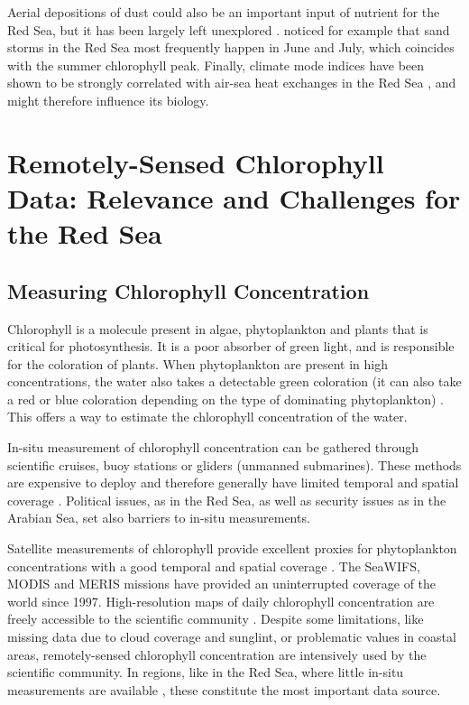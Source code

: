 Aerial depositions of dust could also be an important input of nutrient for the 
Red Sea, but it has been largely left unexplored \citep{Triantafyllou2014}. 
\citet{Raitsos2013} noticed for example that sand storms in the Red Sea most 
frequently happen in June and July, which coincides with the summer chlorophyll 
peak. Finally, climate mode indices have been shown to be strongly correlated 
with air-sea heat exchanges in the Red Sea \citep{Abulnaja2015}, and might 
therefore influence its biology.

\section{Remotely-Sensed Chlorophyll Data: Relevance and Challenges for the Red
Sea}

\subsection{Measuring Chlorophyll Concentration}

Chlorophyll is a molecule present in algae, phytoplankton and plants that is 
critical for photosynthesis. It is a poor absorber of green light, and is 
responsible for the coloration of plants. When phytoplankton are present in high 
concentrations, the water also takes a detectable green coloration (it can also 
take a red or blue coloration depending on the type of dominating phytoplankton) 
\citep{Robinson2010}. This offers a way to estimate the chlorophyll 
concentration of the water.

In-situ measurement of chlorophyll concentration can be gathered through 
scientific cruises, buoy stations or gliders (unmanned submarines). These 
methods are expensive to deploy and therefore generally have limited temporal 
and spatial coverage \citep{Robinson2010}. Political issues, as in the Red Sea, 
as well as security issues as in the Arabian Sea, set also barriers to in-situ 
measurements.

Satellite measurements of chlorophyll provide excellent proxies for 
phytoplankton concentrations with a good temporal and spatial coverage 
\citep{Robinson2010}. The SeaWIFS, MODIS and MERIS missions have provided an 
uninterrupted coverage of the world since 1997. High-resolution maps of daily 
chlorophyll concentration are freely accessible to the scientific community 
\citep{McClain2009}. Despite some limitations, like missing data due to cloud 
coverage and sunglint, or problematic values in coastal areas, remotely-sensed 
chlorophyll concentration are intensively used by the scientific community. In 
regions, like in the Red Sea, where little in-situ measurements are available 
\citep{Raitsos2013, Brewin2013}, these constitute the most important data 
source.

